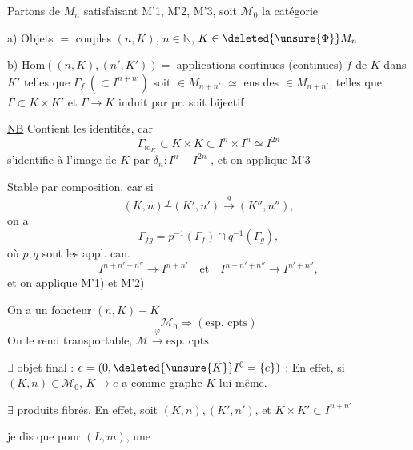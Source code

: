 Partons de $M_n$ satisfaisant M'1, M'2, M'3, soit $\mathcal M_0$ la catégorie  


a) Objets $=$ couples $(n,K)$, $n\in\mathbb N$, $K\in\deleted{\unsure{\Phi}}M_n$

b) $\mathrm{Hom}((n,K),(n',K'))=$   applications continues (continues) $f$ de $K$ dans $K'$ telles que $\Gamma_f\;(\subset I^{n+n'})$ soit $\in M_{n+n'}$
$\simeq$ ens des \inserted{$\Gamma$} $\in M_{n+n'}$, telles que $\Gamma\subset K\times K'$ et $\Gamma\longrightarrow K$ induit par pr. soit bijectif


\uline{NB} Contient les identités, car
\[
\Gamma_{\mathrm{id}_K}\subset K\times K\subset I^n\times I^n\simeq I^{2n}
\]
s'identifie à  l'image de $K$ par $\delta_n:I^n-I^{2n}$ , et on applique M'3

 Stable par composition, car
 si 
\[
(K,n)\mathrel{\overset{f}{-}}(K',n')\xrightarrow{g}(K'',n''),
\]
on a
\[
\Gamma_{fg}=p^{-1}(\Gamma_f)\cap q^{-1}(\Gamma_g),
\]
où $p,q$ sont les appl. can.
\[
I^{n+n'+n''}\longrightarrow I^{n+n'}
\quad\text{et}\quad
I^{n+n'+n''}\longrightarrow I^{n'+n''},
\]
et on applique M'1) et M'2)

On a un foncteur $(n,K)-K$
\[
\mathcal M_0\Longrightarrow(\text{esp. cpts})
\]
On le rend transportable,  $\mathcal M\xrightarrow{\varphi}\text{esp. cpts}$

$\exists$ objet final : $e=(0,\deleted{\unsure{K}}I^0=\{e\})$ : En effet, si $(K,n)\in\mathcal M_0$, $K\longrightarrow e$ a comme graphe $K$ lui-même.

$\exists$ produits fibrés.  En effet, soit
$(K,n),(K',n')$, et $K\times K'\subset I^{n+n'}$

je dis que pour $(L,m)$, une

